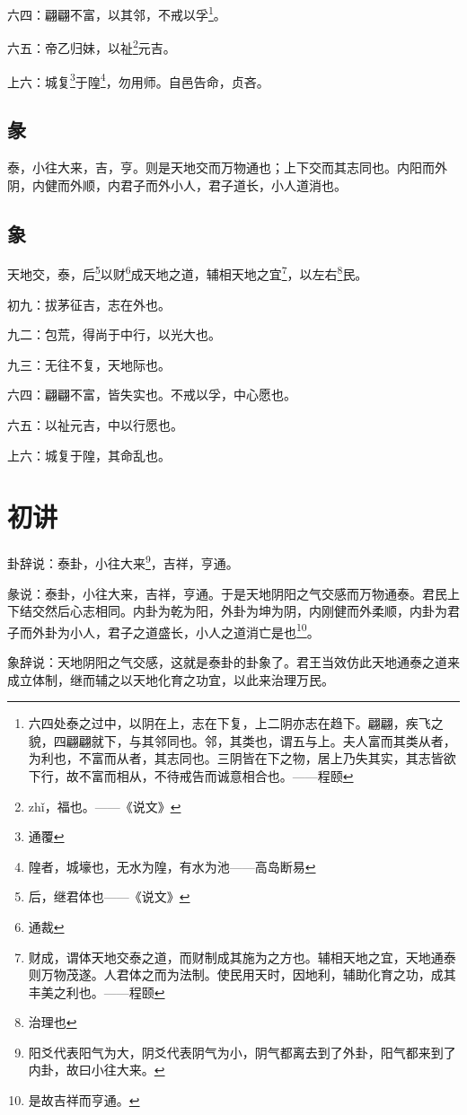 \documentclass[12pt,oneside]{book}
\begin{document}
六四：翩翩不富，以其邻，不戒以孚\footnote{六四处泰之过中，以阴在上，志在下复，上二阴亦志在趋下。翩翩，疾飞之貌，四翩翩就下，与其邻同也。邻，其类也，谓五与上。夫人富而其类从者，为利也，不富而从者，其志同也。三阴皆在下之物，居上乃失其实，其志皆欲下行，故不富而相从，不待戒告而诚意相合也。——程颐}。

六五：帝乙归妹，以祉\footnote{zhǐ，福也。——《说文》}元吉。

上六：城复\footnote{通覆}于隍\footnote{隍者，城壕也，无水为隍，有水为池——高岛断易}，勿用师。自邑告命，贞吝。

\subsection{彖}
泰，小往大来，吉，亨。则是天地交而万物通也；上下交而其志同也。内阳而外阴，内健而外顺，内君子而外小人，君子道长，小人道消也。

\subsection{象}
天地交，泰，后\footnote{后，继君体也——《说文》}以财\footnote{通裁}成天地之道，辅相天地之宜\footnote{财成，谓体天地交泰之道，而财制成其施为之方也。辅相天地之宜，天地通泰则万物茂遂。人君体之而为法制。使民用天时，因地利，辅助化育之功，成其丰美之利也。——程颐}，以左右\footnote{治理也}民。

初九：拔茅征吉，志在外也。

九二：包荒，得尚于中行，以光大也。

九三：无往不复，天地际也。

六四：翩翩不富，皆失实也。不戒以孚，中心愿也。

六五：以祉元吉，中以行愿也。

上六：城复于隍，其命乱也。

\section{初讲}
卦辞说：泰卦，小往大来\footnote{阳爻代表阳气为大，阴爻代表阴气为小，阴气都离去到了外卦，阳气都来到了内卦，故曰小往大来。}，吉祥，亨通。

彖说：泰卦，小往大来，吉祥，亨通。于是天地阴阳之气交感而万物通泰。君民上下结交然后心志相同。内卦为乾为阳，外卦为坤为阴，内刚健而外柔顺，内卦为君子而外卦为小人，君子之道盛长，小人之道消亡是也\footnote{是故吉祥而亨通。}。

象辞说：天地阴阳之气交感，这就是泰卦的卦象了。君王当效仿此天地通泰之道来成立体制，继而辅之以天地化育之功宜，以此来治理万民。
\end{document}
